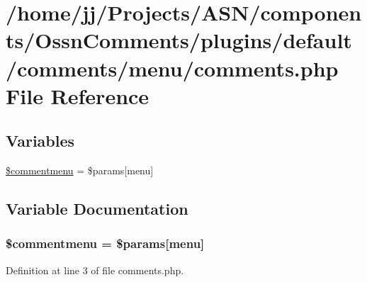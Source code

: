 \hypertarget{_ossn_comments_2plugins_2default_2comments_2menu_2comments_8php}{}\section{/home/jj/\+Projects/\+A\+S\+N/components/\+Ossn\+Comments/plugins/default/comments/menu/comments.php File Reference}
\label{_ossn_comments_2plugins_2default_2comments_2menu_2comments_8php}
\subsection*{Variables}
\begin{DoxyCompactItemize}
\item 
\hyperlink{_ossn_comments_2plugins_2default_2comments_2menu_2comments_8php_a2aca2c616ee21562a365466e2a3286a8}{\$commentmenu} = \$params\mbox{[}\textquotesingle{}menu\textquotesingle{}\mbox{]}
\end{DoxyCompactItemize}


\subsection{Variable Documentation}
\subsubsection[{\texorpdfstring{\$commentmenu}{$commentmenu}}]{\setlength{\rightskip}{0pt plus 5cm}\$commentmenu = \$params\mbox{[}\textquotesingle{}menu\textquotesingle{}\mbox{]}}\hypertarget{_ossn_comments_2plugins_2default_2comments_2menu_2comments_8php_a2aca2c616ee21562a365466e2a3286a8}{}\label{_ossn_comments_2plugins_2default_2comments_2menu_2comments_8php_a2aca2c616ee21562a365466e2a3286a8}


Definition at line 3 of file comments.\+php.

